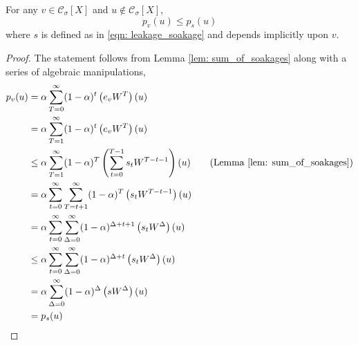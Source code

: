 \documentclass[11pt,twoside]{article}
\newcommand{\1}{\mathbbm{1}}
\newcommand{\pbf}{p}        %
\newcommand{\Xbf}{X}
\newcommand{\Wbf}{W}
\newcommand{\Cset}{\mathcal{C}}
\newcommand{\Csig}{\Cset_{\sigma}}
\begin{document}
\begin{lemma}
	\label{lem: soakage_ppr_lb}
	For any $v \in \Csig[\Xbf]$ and $u \not\in \Csig[\Xbf]$,
	\begin{equation*}
	\pbf_{v}(u) \leq \pbf_{s}(u)
	\end{equation*}
	where $s$ is defined as in \eqref{eqn: leakage_soakage} and depends implicitly upon $v$.
\end{lemma}
\begin{proof}
	The statement follows from Lemma \ref{lem: sum_of_soakages} along with a series of algebraic manipulations,
	\begin{align*}
	\pbf_v(u) & = \alpha\sum_{T = 0}^{\infty} (1 - \alpha)^t \left(e_v \Wbf^T\right)(u) \\
	& = \alpha\sum_{T = 1}^{\infty} (1 - \alpha)^t \left(e_v \Wbf^T\right)(u) \\
	& \leq \alpha \sum_{T=1}^{\infty} (1 - \alpha)^T \left( \sum_{t = 0}^{T - 1} s_t \Wbf^{T - t - 1} \right)(u) \tag{Lemma \ref{lem: sum_of_soakages}}\\
	& = \alpha \sum_{t=0}^{\infty} \sum_{T = t + 1}^{\infty} (1 - \alpha)^T \left( s_t \Wbf^{T - t - 1} \right)(u)\\
	& = \alpha \sum_{t=0}^{\infty} \sum_{\Delta = 0}^{\infty} (1 - \alpha)^{\Delta + t + 1} \left( s_t \Wbf^{\Delta} \right)(u) \\
	& \leq \alpha \sum_{t=0}^{\infty} \sum_{\Delta = 0}^{\infty} (1 - \alpha)^{\Delta + t } \left( s_t \Wbf^{\Delta} \right)(u) \\
	& = \alpha \sum_{\Delta = 0}^{\infty} (1 - \alpha)^{\Delta} \left(s \Wbf^{\Delta}\right)(u) \\
	& = \pbf_s(u)
	\end{align*}
\end{proof}
\end{document}

